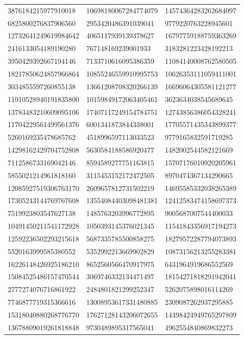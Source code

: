 \begin{longtable}{*{3}{l}}
3876184215977910018&10698180067284774079&14574364283262684097\\
6825800276837906560&2953420486391039041&9779220763228945601\\
12732641249619984642&4065117939139378627&16797759188759363269\\
2416133054189190280&767148169239001933&3183281223428192213\\
3950429392667194146&7133710616095386359&11084140008762580505\\
18217850624857966864&10855246559910995753&10626353111059411001\\
3034855597260855138&13661208708320266139&16696064305581121277\\
11910528940191835800&10159849172063405461&3623634038545689645\\
13783483210609095106&17407117249154784751&12743856386054328241\\
11704229561499561376&6001341873844338001&17705571435343899377\\
5260169235478685762&4518996597113033523&9779165832591719285\\
14298162429704752808&5630584188586920477&1482002544582121669\\
7112586733169042146&8594589277751163815&15707176010920205961\\
5855021214961818160&3115453152172472505&8970474367134290665\\
12085927519306763170&2609657812731502219&14695585332038265389\\
17305243144769767608&13554084403098481381&12412583474158697373\\
7519923803547627138&1485763203996772895&9005687007544400033\\
10491450211541172928&1050393145376021345&11541843356917194273\\
12592236502293215618&5687335785500858275&18279572287794073893\\
5520163999585380552&5352992213669902829&10873156213255283381\\
16226148426925186210&8652560566470917975&6431964919686552569\\
15084525486157470544&3069746332134471497&18154271818291942041\\
2777274076716861922&2484801821299252347&5262075898016114269\\
7746877719315366616&13008953617331480885&2309087262937295885\\
15318040880268776770&17627128143206072655&14498424949765297809\\
13678809019261818848&9730489895317565041&4962554840869832273\\

\end{longtable}
